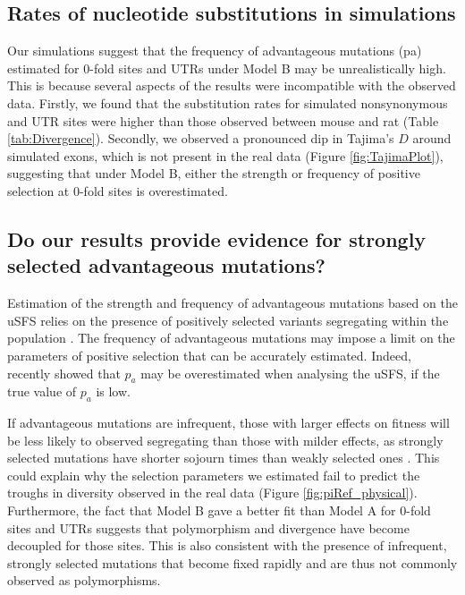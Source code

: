 \subsection{Rates of nucleotide substitutions in simulations}

	Our simulations suggest that the frequency of advantageous mutations (pa) estimated for 0-fold sites and UTRs under Model B may be unrealistically high. This is because several aspects of the results were incompatible with the observed data. Firstly, we found that the substitution rates for simulated nonsynonymous and UTR sites were higher than those observed between mouse and rat (Table \ref{tab:Divergence}). Secondly, we observed a pronounced dip in Tajima's $D$ around simulated exons, which is not present in the real data (Figure \ref{fig:TajimaPlot}), suggesting that under Model B, either the strength or frequency of positive selection at 0-fold sites is overestimated. 

\subsection{Do our results provide evidence for strongly selected advantageous mutations?}

	Estimation of the strength and frequency of advantageous mutations based on the uSFS relies on the presence of positively selected variants segregating within the population \citep{RN201, RN210, RN354}. The frequency of advantageous mutations may impose a limit on the parameters of positive selection that can be accurately estimated. Indeed, \cite{RN354} recently showed that $p_a$ may be overestimated when analysing the uSFS, if the true value of $p_a$ is low. 

	If advantageous mutations are infrequent, those with larger effects on fitness will be less likely to observed segregating than those with milder effects, as strongly selected mutations have shorter sojourn times than weakly selected ones \cite{RN400,RN401}. This could explain why the selection parameters we estimated fail to predict the troughs in diversity observed in the real data (Figure \ref{fig:piRef_physical}). Furthermore, the fact that Model B gave a better fit than Model A for 0-fold sites and UTRs suggests that polymorphism and divergence have become decoupled for those sites. This is also consistent with the presence of infrequent, strongly selected mutations that become fixed rapidly and are thus not commonly observed as polymorphisms.

